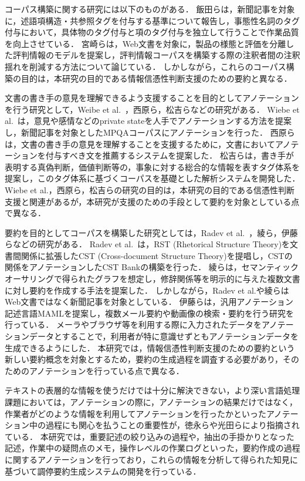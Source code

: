 \documentclass[japanese]{jnlp_1.4}
\begin{document}
コーパス構築に関する研究には以下のものがある．
飯田ら\citeyear{Iida2010}は，新聞記事を対象に，述語項構造・共参照タグを付与する基準について報告し，事態性名詞のタグ付与において，具体物のタグ付与と項のタグ付与を独立して行うことで作業品質を向上させている．
宮崎ら\citeyear{Miyazaki2010}は，Web文書を対象に，製品の様態と評価を分離した評判情報のモデルを提案し，評判情報コーパスを構築する際の注釈者間の注釈揺れを削減する方法について論じている．
しかしながら，これらのコーパス構築の目的は，本研究の目的である情報信憑性判断支援のための要約と異なる．

文書の書き手の意見を理解できるよう支援することを目的としてアノテーションを行う研究として，Weibe et al.~\citeyear{Wiebe2005}，西原ら\cite{Nishihara2011}，松吉ら\cite{Matsuyoshi2010}などの研究がある．
Wiebe et al.~\citeyear{Wiebe2005}は，意見や感情などのprivate stateを人手でアノテーションする方法を提案し，新聞記事を対象としたMPQAコーパスにアノテーションを行った．
西原ら\citeyear{Nishihara2011}は，文書の書き手の意見を理解することを支援するために，文書においてアノテーションを付与すべき文を推薦するシステムを提案した．
松吉ら\citeyear{Matsuyoshi2010}は，書き手が表明する真偽判断，価値判断等の，事象に対する総合的な情報を表すタグ体系を提案し，このタグ体系に基づくコーパスを基礎とした解析システムを開発した．
Wiebe et al.，西原ら，松吉らの研究の目的は，本研究の目的である信憑性判断支援と関連があるが，本研究が支援のための手段として要約を対象としている点で異なる．

要約を目的としてコーパスを構築した研究としては，Radev et al.~\citeyear{Radev2000}，綾ら\cite{Aya2005}，伊藤らなどの研究がある．
Radev et al.~\citeyear{Radev2000}は，RST (Rhetorical Structure Theory)を文書間関係に拡張したCST (Cross-document Structure Theory)を提唱し，CSTの関係をアノテーションしたCST Bankの構築を行った．
綾ら\citeyear{Aya2005}は，セマンティックオーサリングで得られたグラフを想定し，修辞関係等を明示的に与えた複数文書に対し要約を作成する手法を提案した．
しかしながら，Radev et al.や綾らはWeb文書ではなく新聞記事を対象としている．
伊藤ら\citeyear{Ito2004}は，汎用アノテーション記述言語MAMLを提案し，複数メール要約や動画像の検索・要約を行う研究を行っている．
メーラやブラウザ等を利用する際に入力されたデータをアノテーションデータとすることで，利用者が特に意識せずともアノテーションデータを生成できるようにした．
本研究では，情報信憑性判断支援のための要約という新しい要約概念を対象とするため，要約の生成過程を調査する必要があり，そのためのアノテーションを行っている点で異なる．

テキストの表層的な情報を使うだけでは十分に解決できない，より深い言語処理課題においては，アノテーションの際に，アノテーションの結果だけではなく，作業者がどのような情報を利用してアノテーションを行ったかといったアノテーション中の過程にも関心を払うことの重要性が，徳永らや光田らにより指摘されている．
本研究では，重要記述の絞り込みの過程や，抽出の手掛かりとなった記述，作業中の疑問点のメモ，操作レベルの作業ログといった，要約作成の過程に関するアノテーションを行っており，これらの情報を分析して得られた知見に基づいて調停要約生成システムの開発を行っている．
\end{document}
